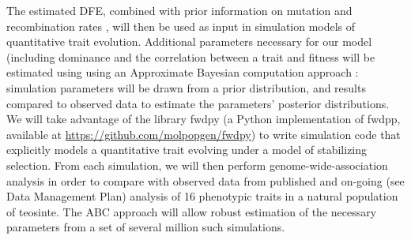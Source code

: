 

The estimated DFE, combined with prior information on mutation \citep{Clark:2005} and recombination rates \citep{Rodgers-Melnick:2014}, will then be used as input in simulation models of quantitative trait evolution. Additional parameters necessary for our model (including dominance and the correlation between a trait and fitness 
will be estimated using using an Approximate Bayesian computation approach \citep{Beaumont:2002ue}: simulation parameters will be drawn from a prior distribution, and results compared to observed data to estimate the parameters' posterior distributions.  We will take advantage of the library fwdpy (a Python implementation of fwdpp, \citealt{Thornton:2014kn} available at \url{https://github.com/molpopgen/fwdpy}) to write simulation code that explicitly models a quantitative trait evolving under a model of stabilizing selection. From each simulation, we will then perform genome-wide-association analysis in order to compare with observed data from published \citep{Weber:2009} and on-going (see Data Management Plan) analysis of 16 phenotypic traits in a natural population of teosinte. The ABC approach will allow robust estimation of the necessary parameters from a set of several million such simulations.

